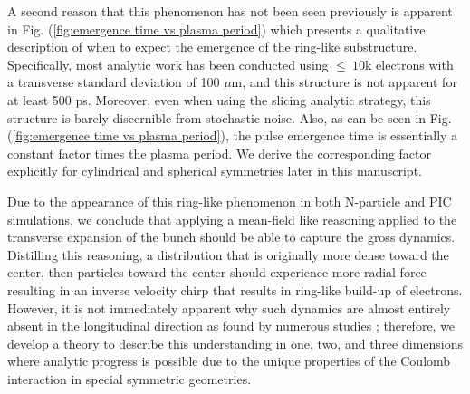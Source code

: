 \documentclass[aps,prl,twocolumn,showpacs,superscriptaddress,groupedaddress]{revtex4-1}  %
\begin{document}
{A second reason that this phenomenon has not been seen previously 
is apparent in Fig. (\ref{fig:emergence time vs plasma period}) which presents a qualitative description of
when to expect the emergence of the ring-like substructure.  Specifically, 
most analytic work has been conducted using $\le~10\text{k}$ electrons with a
transverse standard deviation of 100 $\mu$m, and this structure is
not apparent for at least 500 ps.  Moreover, even when using the slicing 
analytic strategy, this structure is barely discernible from stochastic noise.  Also, as can be seen
in Fig. (\ref{fig:emergence time vs plasma period}), the pulse emergence time is essentially
a constant factor times the plasma period.  We derive
the corresponding factor explicitly for cylindrical and spherical symmetries later in this manuscript.


Due to the appearance of this ring-like phenomenon in both 
N-particle and PIC simulations, we conclude that applying a mean-field like reasoning 
applied to the transverse expansion of the bunch should be able to
capture the gross dynamics.  Distilling this reasoning, a distribution that is originally more dense 
toward the center, then particles toward the center should experience more radial force resulting in an inverse velocity chirp
that results in ring-like build-up of electrons.  However, it is not immediately apparent why such dynamics are almost
entirely absent in the 
longitudinal direction as found by numerous studies \cite{Luiten:2004_uniform_ellipsoidal,Siwick:2002_mean_field,Reed:2006_short_pulse_theory}; therefore, we develop a theory to describe this understanding in one, two, and three dimensions
where analytic progress is possible due to the unique properties of the Coulomb interaction in 
special symmetric geometries. 

}
\end{document}
